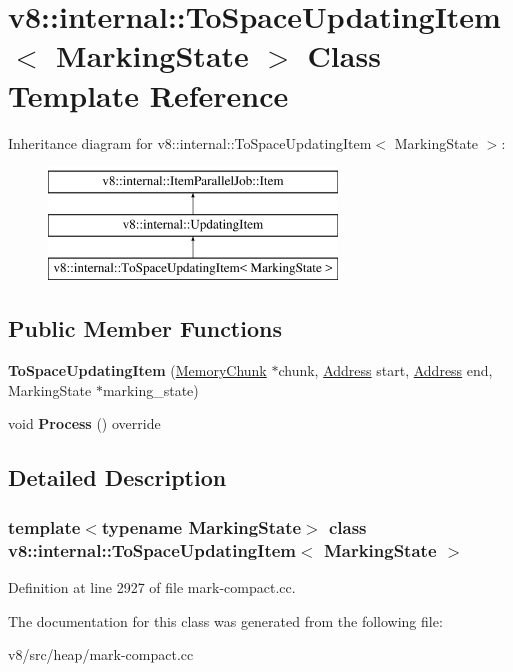 \hypertarget{classv8_1_1internal_1_1ToSpaceUpdatingItem}{}\section{v8\+:\+:internal\+:\+:To\+Space\+Updating\+Item$<$ Marking\+State $>$ Class Template Reference}
\label{classv8_1_1internal_1_1ToSpaceUpdatingItem}
Inheritance diagram for v8\+:\+:internal\+:\+:To\+Space\+Updating\+Item$<$ Marking\+State $>$\+:\begin{figure}[H]
\begin{center}
\leavevmode
\includegraphics[height=3.000000cm]{classv8_1_1internal_1_1ToSpaceUpdatingItem}
\end{center}
\end{figure}
\subsection*{Public Member Functions}
\begin{DoxyCompactItemize}
\item 
\mbox{\label{classv8_1_1internal_1_1ToSpaceUpdatingItem_aff8228d3e1bf0456cbf7c7971f95ec69}} 
{\bfseries To\+Space\+Updating\+Item} (\mbox{\hyperlink{classv8_1_1internal_1_1MemoryChunk}{Memory\+Chunk}} $\ast$chunk, \mbox{\hyperlink{classuintptr__t}{Address}} start, \mbox{\hyperlink{classuintptr__t}{Address}} end, Marking\+State $\ast$marking\+\_\+state)
\item 
\mbox{\label{classv8_1_1internal_1_1ToSpaceUpdatingItem_ac514ae516afc339dd7a238a47e9227ac}} 
void {\bfseries Process} () override
\end{DoxyCompactItemize}


\subsection{Detailed Description}
\subsubsection*{template$<$typename Marking\+State$>$\newline
class v8\+::internal\+::\+To\+Space\+Updating\+Item$<$ Marking\+State $>$}



Definition at line 2927 of file mark-\/compact.\+cc.



The documentation for this class was generated from the following file\+:\begin{DoxyCompactItemize}
\item 
v8/src/heap/mark-\/compact.\+cc\end{DoxyCompactItemize}
